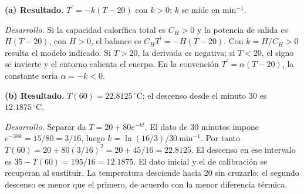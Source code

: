 \noindent\textbf{(a) Resultado.} $T^{\prime}=-k(T-20)$ con $k>0$; $k$ se mide en $\mathrm{min}^{-1}$.

\noindent\textit{Desarrollo.} Si la capacidad calorífica total es $C_H>0$ y la potencia de salida es $H(T-20)$, con $H>0$, el balance es $C_HT^{\prime}=-H(T-20)$. Con $k=H/C_H>0$ resulta el modelo indicado. Si $T>20$, la derivada es negativa; si $T<20$, el signo se invierte y el entorno calienta el cuerpo. En la convención $T^{\prime}=\alpha(T-20)$, la constante sería $\alpha=-k<0$.

\medskip

\noindent\textbf{(b) Resultado.} $T(60)=22.8125\,{}^\circ\mathrm C$; el descenso desde el minuto 30 es $12.1875\,{}^\circ\mathrm C$.

\noindent\textit{Desarrollo.} Separar da $T=20+80e^{-kt}$. El dato de 30 minutos impone $e^{-30k}=15/80=3/16$, luego $k=\ln(16/3)/30\ \mathrm{min}^{-1}$. Por tanto $T(60)=20+80(3/16)^2=20+45/16=22.8125$. El descenso en ese intervalo es $35-T(60)=195/16=12.1875$. El dato inicial y el de calibración se recuperan al sustituir. La temperatura desciende hacia 20 sin cruzarlo; el segundo descenso es menor que el primero, de acuerdo con la menor diferencia térmica.
